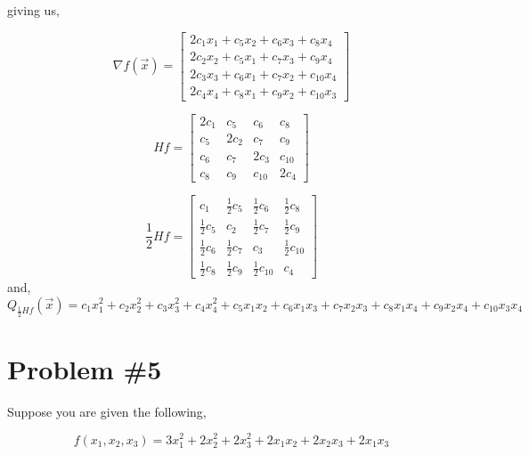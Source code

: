 \documentclass{article}
\begin{document}
giving us,

\begin{equation*}
    \nabla f(\vec{x}) = \begin{bmatrix*}
        2c_1x_1 +c_5x_2 + c_6x_3 + c_8x_4 \\
        2c_2x_2 + c_5x_1 + c_7x_3 + c_9x_4\\
        2c_3x_3 + c_6x_1 + c_7x_2 + c_{10}x_4 \\
        2c_4x_4 + c_8x_1 + c_9x_2 + c_{10}x_3
    \end{bmatrix*}
\end{equation*}

\begin{equation*}
    Hf = \begin{bmatrix*}
        2c_1 & c_5 & c_6 & c_8\\
        c_5 & 2c_2 & c_7 & c_9\\
        c_6 & c_7 & 2c_3 & c_{10}\\
        c_8 & c_9 & c_{10} & 2c_4
    \end{bmatrix*}
\end{equation*}

\begin{equation*}
     \frac{1}{2}Hf = \begin{bmatrix*}
        c_1 & \frac{1}{2}c_5 & \frac{1}{2}c_6 & \frac{1}{2}c_8\\
        \frac{1}{2}c_5 & c_2 & \frac{1}{2}c_7 & \frac{1}{2}c_9\\
        \frac{1}{2}c_6 & \frac{1}{2}c_7 & c_3 & \frac{1}{2}c_{10}\\
        \frac{1}{2}c_8 & \frac{1}{2}c_9 & \frac{1}{2}c_{10} & c_4
    \end{bmatrix*}
\end{equation*}
and,
\begin{equation*}
    Q_{\frac{1}{2}Hf}(\vec{x}) =c_1x_1^2 + c_2x_2^2 + c_3x_3^2 + c_4x_4^2 + c_5x_1x_2 + c_6x_1x_3 + c_7x_2x_3 + c_8x_1x_4 + c_9x_2x_4 + c_{10}x_3x_4
\end{equation*}

\section*{Problem \#5}
Suppose you are given the following,

\begin{equation*}
    f(x_1,x_2,x_3) = 3x_1^2 + 2x_2^2 + 2x_3^2+2x_1x_2 + 2x_2x_3 + 2x_1x_3
\end{equation*}
\end{document}
